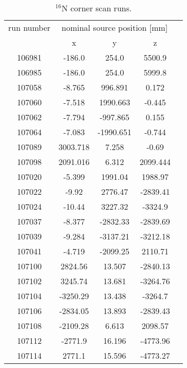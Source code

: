 \begin{table}[ht]
	\caption[$^{16}$N corner scan runs.]{$^{16}$N corner scan runs.	\label{table:n16scanTable_corner}}
			\vspace{2mm}
	\centering
	\begin{tabular*}{90mm}{c@{\extracolsep{\fill}}*4c}
		\toprule 
		run number  & \multicolumn{3}{c}{nominal source position [mm]}  \\
		\cline{2-4}
		& x & y & z\\   
		\midrule
        106981  & -186.0 & 254.0 & 5500.9\\
        106985  & -186.0 & 254.0 & 5999.8\\
        107058  & -8.765 & 996.891 & 0.172\\
        107060  & -7.518 & 1990.663 & -0.445\\
        107062  & -7.794 & -997.865 & 0.155\\
        107064  & -7.083 & -1990.651 & -0.744\\
        107089  & 3003.718 & 7.258 & -0.69\\
        107098  & 2091.016 & 6.312 & 2099.444\\
        107020  & -5.399 &  1991.04 &  1988.97\\
        107022  & -9.92 &  2776.47 &  -2839.41\\
        107024  & -10.44 &  3227.32 &  -3324.9\\
        107037  & -8.377 &  -2832.33 &  -2839.69\\
        107039  & -9.284 &  -3137.21 &  -3212.18\\
        107041  & -4.719 &  -2099.25 &  2110.71\\
        107100  & 2824.56 &  13.507 &  -2840.13\\
        107102  & 3245.74 &  13.681 &  -3264.76\\
        107104  & -3250.29 &  13.438 &  -3264.7\\
        107106  & -2834.05 &  13.893 &  -2839.43\\
        107108  & -2109.28 &  6.613 &  2098.57\\
        107112  & -2771.9 &  16.196 &  -4773.96\\
        107114  & 2771.1 &  15.596 &  -4773.27\\
		\bottomrule	
	\end{tabular*}
\end{table}

